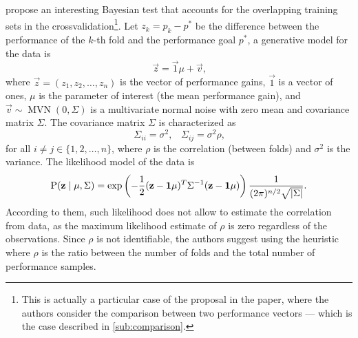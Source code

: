 \textcite{Benavoli2017} propose an interesting Bayesian test that accounts for the
overlapping training sets in the \gls{crossvalidation}\footnote{%
This is actually a particular case of the proposal in the paper, where the authors
consider the comparison between two performance vectors --- which is the case described in
\cref{sub:comparison}.}.
Let $z_k = p_k - p^{*}$ be the
difference between the performance of the $k$-th fold and the performance goal $p^{*}$,
a generative model for the data is
\begin{equation*}
  \vec{z} = \vec{1}\mu + \vec{v}\text{,}
\end{equation*}
where $\vec{z} = (z_1, z_2, \ldots, z_n)$ is the vector of performance gains, $\vec{1}$ is a
vector of ones, $\mu$ is the parameter of interest (the mean performance gain), and
$\vec{v} \sim \operatorname{MVN}(0, \Sigma)$ is a multivariate normal noise with zero mean
and covariance matrix $\Sigma$.  The covariance matrix $\Sigma$ is characterized as
\begin{equation*}
  \Sigma_{ii} = \sigma^2\text{,}\quad
  \Sigma_{ij} = \sigma^2\rho\text{,}
\end{equation*}
for all $i \neq j \in \{1, 2, \ldots, n\}$, where $\rho$ is the correlation (between folds)
and $\sigma^2$ is the variance.  The likelihood model of the data is
\begin{equation*}
  \operatorname{P}(\mathbf{z} \mid \mu, \Sigma) =
    \exp\left(-\frac{1}{2}(\mathbf{z} - \mathbf{1}\mu)^T \Sigma^{-1} (\mathbf{z} - \mathbf{1}\mu)\right)
    \frac{1}{(2\pi)^{n/2} \sqrt{\lvert \Sigma \rvert}}\text{.}
\end{equation*}
According to them, such likelihood does not allow to estimate the correlation from data,
as the maximum likelihood estimate of $\rho$ is zero regardless of the observations.
Since $\rho$ is not identifiable, the authors suggest using the heuristic where $\rho$ is
the ratio between the number of folds and the total number of performance samples.


